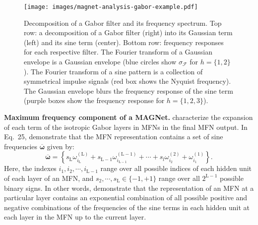 \documentclass{article} \usepackage{iclr2022_conference,times}
\begin{document}
\begin{figure}[t]
    \vspace{-2.5mm}
    \centering
    \texttt{[image: images/magnet-analysis-gabor-example.pdf]}
    \caption{Decomposition of  a Gabor filter and its frequency spectrum. Top row: a decomposition of a Gabor filter (right) into its Gaussian term (left) and its sine term (center). Bottom row: frequency responses for each respective filter. The Fourier transform of a Gaussian envelope is a Gaussian envelope (blue circles show $\sigma_{\mathcal{F}}$ for $h = \{1, 2\}$). The Fourier transform of a sine pattern is a collection of symmetrical impulse signals (red box shows the Nyquist frequency). The Gaussian envelope blurs the frequency response of the sine term (purple boxes show the frequency response for $h = \{1, 2, 3\}$).
    \vspace{-2mm}}
    \label{fig:gabor-example}
\end{figure}

\textbf{Maximum frequency component of a MAGNet.} \citet{fathony2021multiplicative} characterize the expansion of each term of the isotropic Gabor layers in MFNs in the final MFN output. In Eq.~25, \citet{fathony2021multiplicative} demonstrate that the MFN representation contains a set of sine frequencies $\boldsymbol{\overline{\omega}}$ given by:
\begin{equation}
    \boldsymbol{\overline{\omega}} = \left\{ s_{\mathrm{L}} \omega_{i_{\mathrm{L}}}^{({\mathrm{L}})} + s_{\mathrm{L-1}} \omega_{i_{\mathrm{L-1}}}^{({\mathrm{L-1}})} + \cdots + s_l \omega_{i_2}^{(2)} + \omega_{i_1}^{(1)} \right\}.
\end{equation}
Here, the indexes $i_1, i_2, \cdots, i_{\mathrm{L}-1}$ range over all possible indices of each hidden unit of each layer of an MFN, and $s_2, \cdots, s_\mathrm{L} \in \{-1, +1\}$ range over all $2^{\mathrm{L}-1}$ possible binary signs. In other words, \citet{fathony2021multiplicative} demonstrate that the representation of an MFN at a particular layer contains an exponential combination of all possible positive and negative combinations of the frequencies of the sine terms in each hidden unit at each layer in the MFN up to the current layer.
\end{document}
